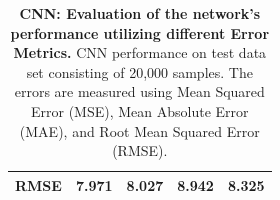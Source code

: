 \documentclass[a4paper, UKenglish, 11pt]{uiomaster}
\begin{document}
\begin{table}[!htb]
\begin{tabular}{l|cccc|}
\multicolumn{1}{|l|}{\cellcolor[HTML]{EFEFEF}RMSE} & \multicolumn{1}{c|}{7.971}                                                                                  & \multicolumn{1}{c|}{8.027}                                                                                   & \multicolumn{1}{c|}{8.942}                                                                                   & 8.325                                                                                                              \\ \hline
\end{tabular}
\caption{\textbf{CNN: Evaluation of the network's performance utilizing different Error Metrics.} \newline
CNN performance on test data set consisting of 20,000 samples. The errors are measured using Mean Squared Error (MSE), Mean Absolute Error (MAE), and Root Mean Squared Error (RMSE).}
\label{table:error_multiple_dipoles-2}
\end{table}

%
\end{document}
